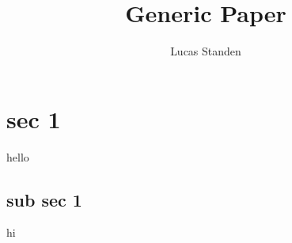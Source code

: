 \documentclass[a4paper,12pt]{article}
\author{Lucas Standen}
\title{Generic Paper}
\begin{document}
\maketitle
\newpage
\tableofcontents
\newpage

\section{sec 1}
hello
\subsection{sub sec 1}
hi
\end{document}
